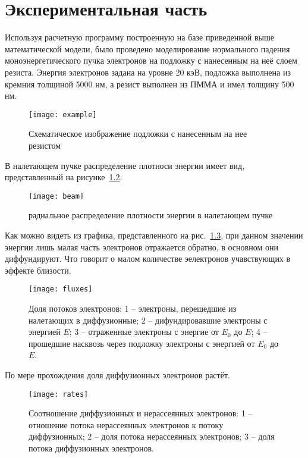 \chapter{Экспериментальная часть}
Используя расчетную программу построенную на базе приведенной выше математической модели, было проведено моделирование нормального падения моноэнергетического пучка электронов на подложку с нанесенным на неё слоем резиста. Энергия электронов задана на уровне 20 кэВ, подложка выполнена из кремния толщиной 5000 нм, а резист выполнен из ПММА и имел толщину 500 нм.

\begin{figure}[h]
    \center
    \texttt{[image: example]}
    \caption{Схематическое изображение подложки с нанесенным на нее резистом}
    \label{fig:example}
\end{figure}

В налетающем пучке распределение плотноси энергии имеет вид, представленный на рисунке~\ref{fig:beam}.
\begin{figure}[h]
    \center
    \texttt{[image: beam]}
    \caption{радиальное распределение плотности энергии в налетающем пучке}
    \label{fig:beam}
\end{figure}

Как можно видеть из графика, представленного на рис.~\ref{fig:fluxes}, при данном значении энергии лишь малая часть электронов отражается обратно, в основном они диффундируют. Что говорит о малом количестве эелектронов учавствующих в эффекте близости.
\begin{figure}[h]
    \center
    \texttt{[image: fluxes]}
    \caption{Доля потоков электронов:
    1 -- электроны, перешедшие из налетающих в диффузионные;
2 -- дифундировавшие электроны с энергией $E$;
3 -- отраженные электроны с энергие от $E_0$ до $E$;
4 -- прошедшие насквозь через подложку электроны с энергией от $E_0$ до $E$.
}
    \label{fig:fluxes}
\end{figure}


По мере прохождения доля диффузионных электронов растёт.

\begin{figure}[h]
    \center
    \texttt{[image: rates]}
    \caption{Соотношение диффузионных и нерассеянных электронов: 1 -- отношение потока нерассеянных электронов к потоку диффузионных;
2 -- доля потока нерассеянных электронов;
3 -- доля потока диффузионных электронов.
}
    \label{fig:rates}
\end{figure}

